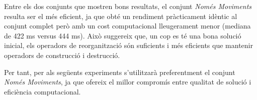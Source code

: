 Entre els dos conjunts que mostren bons resultats, el conjunt \textit{Només Moviments} resulta ser el més eficient, ja que obté un rendiment pràcticament idèntic al conjunt complet però amb un cost computacional lleugerament menor (mediana de 422 ms versus 444 ms). Això suggereix que, un cop es té una bona solució inicial, els operadors de reorganització són suficients i més eficients que mantenir operadors de construcció i destrucció.

Per tant, per als següents experiments s'utilitzarà preferentment el conjunt \textit{Només Moviments}, ja que ofereix el millor compromís entre qualitat de solució i eficiència computacional.